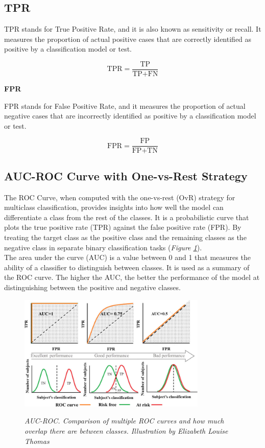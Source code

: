\subsection{TPR}

TPR stands for True Positive Rate, and it is also known as sensitivity or recall.
It measures the proportion of actual positive cases that are correctly identified as positive
by a classification model or test.

\[
\text{TPR} = \frac{\text{TP}}{\text{TP} + \text{FN}}
\]

\item \textbf{FPR}

FPR stands for False Positive Rate, and it measures the proportion of actual negative cases that are incorrectly identified as positive by a classification model or test.

\[
\text{FPR} = \frac{\text{FP}}{\text{FP} + \text{TN}}
\]

\subsection{AUC-ROC Curve with One-vs-Rest Strategy}

The ROC Curve, when computed with the one-vs-rest (OvR) strategy for multiclass classification, provides insights into how well the model can differentiate a class from the rest of the classes. It is a probabilistic curve that plots the true positive rate (TPR) against the false positive rate (FPR). By treating the target class as the positive class and the remaining classes as the negative class in separate binary classification tasks (\textit{Figure \ref{fig:auc-roc}}). \\

The area under the curve (AUC) is a value between 0 and 1 that measures
the ability of a classifier to distinguish between classes. It is used as a summary
of the ROC curve. The higher the AUC, the better the performance of the
model at distinguishing between the positive and negative classes.

\begin{figure}[H]
\centering
\includegraphics[width=0.8\textwidth]{imatges/preliminaries/auc.png}
    \caption[Forward Propagation and Backward Propagation]{\textit{AUC-ROC. Comparison of multiple ROC curves and how much overlap there are between classes. Illustration by Elizabeth Louise Thomas}}
{\label{fig:auc-roc}}
\end{figure}


